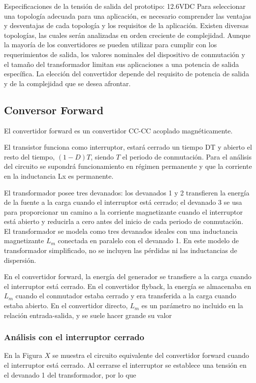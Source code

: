 Especificaciones de la tensión de salida del prototipo: 12.6VDC
Para seleccionar una topología adecuada para una aplicación, es necesario comprender las ventajas y desventajas de cada topología y los requisitos de la aplicación. 
Existen diversas topologías, las cuales serán analizadas en orden creciente de complejidad. 
Aunque la mayoría de los convertidores se pueden utilizar para cumplir con los requerimientos de salida, 
los valores nominales del dispositivo de conmutación y el tamaño del transformador limitan sus aplicaciones a una potencia de salida específica. 
La elección del convertidor depende del requisito de potencia de salida y de la complejidad que se desea afrontar.

\subsection{Conversor Forward}

El convertidor forward es un convertidor CC-CC acoplado magnéticamente. 

El transistor funciona como interruptor, estará cerrado un tiempo DT y abierto el resto del tiempo,
$(1 - D)T$, siendo $T$ el periodo de conmutación. 
Para el análisis del circuito se supondrá funcionamiento 
en régimen permanente y que la corriente en la inductancia Lx es permanente.

El transformador posee tres devanados: los devanados 1 y 2 transfieren la energía de la
fuente a la carga cuando el interruptor está cerrado; el devanado 3 se usa para proporcionar un
camino a la corriente magnetizante cuando el interruptor está abierto y reducirla a cero antes del
inicio de cada periodo de conmutación. El transformador se modela como tres devanados ideales
con una inductancia magnetizante $L_m$ conectada en paralelo con el devanado 1. En este modelo
de transformador simplificado, no se incluyen las pérdidas ni las inductancias de dispersión.

En el convertidor forward, la energía del generador se transfiere a la carga cuando el interruptor
está cerrado. En el convertidor flyback, la energía se almacenaba en $L_m$ cuando el conmutador
estaba cerrado y era transferida a la carga cuando estaba abierto. En el convertidor directo, $L_m$
es un parámetro no incluido en la relación entrada-salida, y se suele hacer grande su valor

\subsubsection{Análisis con el interruptor cerrado}
En la Figura $X$ se muestra el circuito equivalente del convertidor forward cuando el interruptor
está cerrado. Al cerrarse el interruptor se establece una tensión en el devanado 1 del transformador,
por lo que

